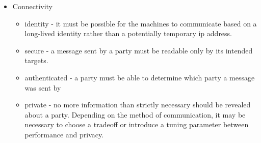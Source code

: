 \documentclass[
]{article}
\providecommand{\tightlist}{%
  \setlength{\itemsep}{0pt}\setlength{\parskip}{0pt}}
\begin{document}
\begin{itemize}
        \begin{itemize}
          \tightlist
          \item
                cross region - the machines should be provisioned in multiple
                geographical regions in order to be able to observe the effects of
                varying latency on the system
          \item
                cross platform - in a real world scenario the machines will be
                controlled by different parties that run various operating systems,
                hardware architectures and deployed using different tools,
                e.g.~Party A might be an enterprise that uses containers, while
                Party B is a power user running a few \glspl{vm} and Party C
                ****could be using an ARM-based raspberry pi
          \item
                automated - appropriate tools should be chosen to allow
                automatically deploying and destroying the runtime environment
                without manual intervention other than running a minimal set of
                commands
          \item
                reproducible - it should be easy for others to reproduce the test
                setup in their own environment
          \item
                disposable - \gls{e3} should be easy to destroy and quickly recreate
                from scratch at any time; as in the famous DevOps
                analogy\autocite{biasHistoryPetsVs2016}, it should be based on
                machines that are like cattle rather than pets
        \end{itemize}
  \item
        Connectivity

        \begin{itemize}
          \tightlist
          \item
                identity - it must be possible for the machines to communicate based
                on a long-lived identity rather than a potentially temporary
                \gls{ip} address.
          \item
                secure - a message sent by a party must be readable only by its
                intended targets.
          \item
                authenticated - a party must be able to determine which party a
                message was sent by
          \item
                private - no more information than strictly necessary should be
                revealed about a party. Depending on the method of communication, it
                may be necessary to choose a tradeoff or introduce a tuning
                parameter between performance and privacy.
        \end{itemize}
\end{itemize}
\end{document}
